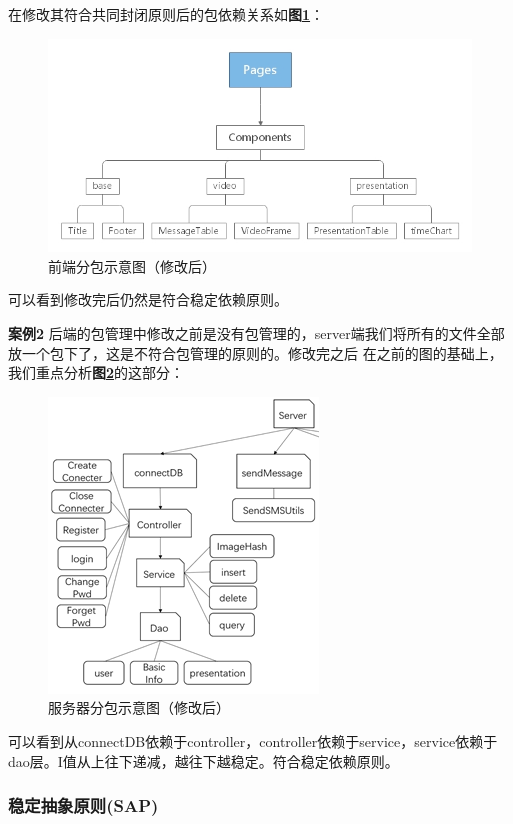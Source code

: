 \documentclass[article]{BJTU-thesis}
\begin{document}
在修改其符合共同封闭原则后的包依赖关系如\textbf{图\ref{fig:fig21}}：
\begin{figure}[!htbp]
	\centering
	\includegraphics[scale=0.8]{img/18.jpg}
	\caption{前端分包示意图（修改后）}\label{fig:fig21}
\end{figure}

可以看到修改完后仍然是符合稳定依赖原则。

\textbf{案例2} 后端的包管理中修改之前是没有包管理的，server端我们将所有的文件全部放一个包下了，这是不符合包管理的原则的。修改完之后
	在之前的图的基础上，我们重点分析\textbf{图\ref{fig:fig22}}的这部分：
	
	\begin{figure}[!htbp]
		\centering
		\includegraphics[scale=1.5]{img/21.png}
		\caption{服务器分包示意图（修改后）}\label{fig:fig22}
	\end{figure}
	
	可以看到从connectDB依赖于controller，controller依赖于service，service依赖于dao层。I值从上往下递减，越往下越稳定。符合稳定依赖原则。
	
\subsubsection{稳定抽象原则(SAP)}
\end{document}
